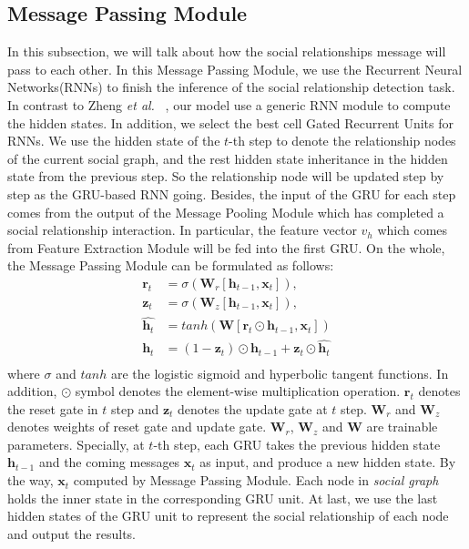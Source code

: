 \documentclass{article}
\newcommand{\etal}{{\it et al.}}
\begin{document}
\subsection{Message Passing Module} \label{section:RRNN}
In this subsection, we will talk about how the social relationships message will pass to each other.
In this Message Passing Module, we use the Recurrent Neural Networks(RNNs) to finish the inference of the social relationship detection task. In contrast to Zheng {\etal} \ \cite{DBLP:conf/iccv/0001JRVSDHT15}, our model use a generic RNN module to compute the hidden states. In addition, we select the best cell Gated Recurrent Units \cite{DBLP:conf/ssst/ChoMBB14} for RNNs. We use the hidden state of the $t$-th step to denote the relationship nodes of the current social graph, and the rest hidden state inheritance in the hidden state from the previous step. So the relationship node will be updated step by step as the GRU-based RNN going. Besides, the input of the GRU for each step comes from the output of the Message Pooling Module which has completed a social relationship interaction. In particular, the feature vector $v_h$ which comes from Feature Extraction Module will be fed into the first GRU. On the whole, the Message Passing Module can be formulated as follows:
\begin{equation} \label{eq:gru}
\begin{split}
\bm{r}_t &=  \sigma(\bm{W}_{r}[\bm{h}_{t-1}, \bm{x}_t]), \\
\bm{z}_t &=  \sigma(\bm{W}_{z}[\bm{h}_{t-1}, \bm{x}_t]), \\
\hat{\bm{h}_t} &= tanh(\bm{W}[\bm{r}_t \odot \bm{h}_{t-1}, \bm{x}_{t}])\\
\bm{h}_t &= (1 - \bm{z}_t) \odot \bm{h}_{t - 1} + \bm{z}_t \odot \hat{\bm{h}_t} \\
\end{split}
\end{equation}
where $\sigma$ and $tanh$ are the logistic sigmoid and hyperbolic tangent functions. In addition, $\odot$ symbol denotes the element-wise multiplication operation. $\bm{r}_t$ denotes the reset gate in $t$ step and $\bm{z}_t$ denotes the update gate at $t$ step. $\bm{W}_r$ and $\bm{W}_z$ denotes weights of reset gate and update gate. $\bm{W}_r$, $\bm{W}_z$ and $\bm{W}$ are trainable parameters. Specially, at $t$-th step, each GRU takes the previous hidden state $\bm{h}_{t-1}$ and the coming messages $\bm{x}_{t}$ as input, and produce a new hidden state. By the way, $\bm{x}_t$ computed by Message Passing Module. Each node in \emph{social graph} holds the inner state in the corresponding GRU unit. At last, we use the last hidden states of the GRU unit to represent the social relationship of each node and output the results.
\end{document}
